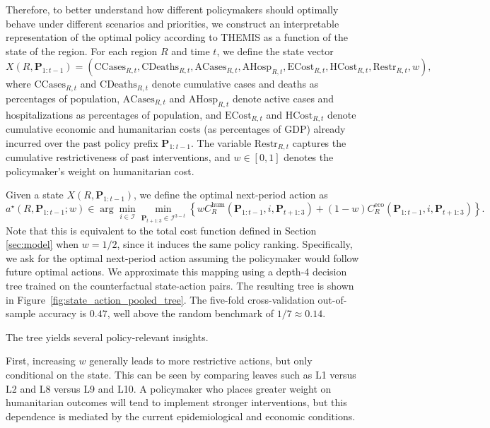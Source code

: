 \documentclass[msom,blindrev]{informs3} %
\begin{document}
{Therefore, to better understand how different policymakers should optimally behave under different scenarios and priorities, we construct an interpretable representation of the optimal policy according to THEMIS as a function of the state of the region. For each region $R$ and time $t$, we define the state vector
\[
X(R,\bm{P}_{1:t-1})
=
\left(
\mathrm{CCases}_{R,t},
\mathrm{CDeaths}_{R,t},
\mathrm{ACases}_{R,t},
\mathrm{AHosp}_{R,t},
\mathrm{ECost}_{R,t},
\mathrm{HCost}_{R,t},
\mathrm{Restr}_{R,t},
w
\right),
\]
where $\mathrm{CCases}_{R,t}$ and $\mathrm{CDeaths}_{R,t}$ denote cumulative cases and deaths as percentages of population, $\mathrm{ACases}_{R,t}$ and $\mathrm{AHosp}_{R,t}$ denote active cases and hospitalizations as percentages of population, and $\mathrm{ECost}_{R,t}$ and $\mathrm{HCost}_{R,t}$ denote cumulative economic and humanitarian costs (as percentages of GDP) already incurred over the past policy prefix $\bm{P}_{1:t-1}$. The variable $\mathrm{Restr}_{R,t}$ captures the cumulative restrictiveness of past interventions, and $w \in [0,1]$ denotes the policymaker’s weight on humanitarian cost.

Given a state $X(R,\bm{P}_{1:t-1})$, we define the optimal next-period action as
\[
a^\star(R,\bm{P}_{1:t-1};w)
\in \arg\min_{i\in\mathcal{I}}
\min_{\bm{P}_{t+1:3}\in\mathcal{I}^{3-t}}
\left\{
w C^{\mathrm{hum}}_R(\bm{P}_{1:t-1},i,\bm{P}_{t+1:3})
+(1-w)C^{\mathrm{eco}}_R(\bm{P}_{1:t-1},i,\bm{P}_{t+1:3})
\right\}.
\]
Note that this is equivalent to the total cost function defined in Section \ref{sec:model} when $w=1/2$, since it induces the same policy ranking. Specifically, we ask for the optimal next-period action assuming the policymaker would follow future optimal actions. We approximate this mapping using a depth-4 decision tree trained on the counterfactual state-action pairs. The resulting tree is shown in Figure~\ref{fig:state_action_pooled_tree}. The five-fold cross-validation out-of-sample accuracy is $0.47$, well above the random benchmark of $1/7 \approx 0.14$.

The tree yields several policy-relevant insights.

First, increasing $w$ generally leads to more restrictive actions, but only conditional on the state. This can be seen by comparing leaves such as L1 versus L2 and L8 versus L9 and L10. A policymaker who places greater weight on humanitarian outcomes will tend to implement stronger interventions, but this dependence is mediated by the current epidemiological and economic conditions.

}
\end{document}
